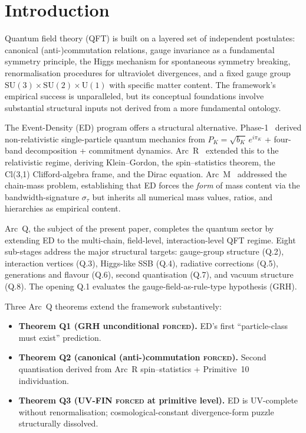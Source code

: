 \documentclass[11pt,a4paper]{article}
\begin{document}
\section{Introduction}

Quantum field theory (QFT) is built on a layered set of independent postulates: canonical (anti-)commutation relations, gauge invariance as a fundamental symmetry principle, the Higgs mechanism for spontaneous symmetry breaking, renormalisation procedures for ultraviolet divergences, and a fixed gauge group $\mathrm{SU}(3) \times \mathrm{SU}(2) \times \mathrm{U}(1)$ with specific matter content. The framework's empirical success is unparalleled, but its conceptual foundations involve substantial structural inputs not derived from a more fundamental ontology.

The Event-Density (ED) program offers a structural alternative. Phase-1~\cite{phase1} derived non-relativistic single-particle quantum mechanics from $P_K = \sqrt{b_K}\,e^{i\pi_K}$ + four-band decomposition + commitment dynamics. Arc~R~\cite{arcr} extended this to the relativistic regime, deriving Klein--Gordon, the spin--statistics theorem, the Cl(3,1) Clifford-algebra frame, and the Dirac equation. Arc~M~\cite{arcm} addressed the chain-mass problem, establishing that ED forces the \emph{form} of mass content via the bandwidth-signature $\sigma_\tau$ but inherits all numerical mass values, ratios, and hierarchies as empirical content.

Arc~Q, the subject of the present paper, completes the quantum sector by extending ED to the multi-chain, field-level, interaction-level QFT regime. Eight sub-stages address the major structural targets: gauge-group structure (Q.2), interaction vertices (Q.3), Higgs-like SSB (Q.4), radiative corrections (Q.5), generations and flavour (Q.6), second quantisation (Q.7), and vacuum structure (Q.8). The opening Q.1 evaluates the gauge-field-as-rule-type hypothesis (GRH).

Three Arc~Q theorems extend the framework substantively:
\begin{itemize}
  \item \textbf{Theorem Q1 (GRH unconditional \textsc{forced}).} ED's first ``particle-class must exist'' prediction.
  \item \textbf{Theorem Q2 (canonical (anti-)commutation \textsc{forced}).} Second quantisation derived from Arc~R spin--statistics + Primitive~10 individuation.
  \item \textbf{Theorem Q3 (UV-FIN \textsc{forced} at primitive level).} ED is UV-complete without renormalisation; cosmological-constant divergence-form puzzle structurally dissolved.
\end{itemize}
\end{document}
